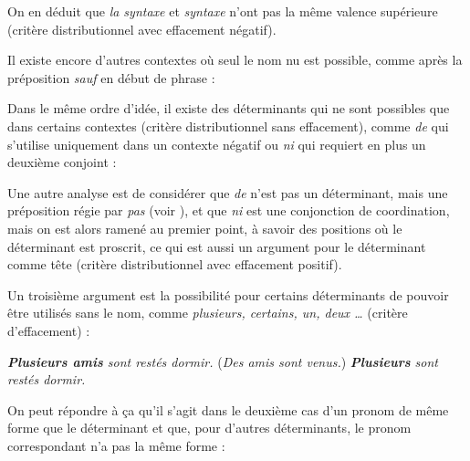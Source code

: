 On en déduit que \textit{la syntaxe} et \textit{syntaxe} n’ont pas la même valence supérieure (critère distributionnel avec effacement négatif).

Il existe encore d’autres contextes où seul le nom nu est possible, comme après la préposition \textit{sauf} en début de phrase :

\ea
  \z
\z

Dans le même ordre d’idée, il existe des déterminants qui ne sont possibles que dans certains contextes (critère distributionnel sans effacement), comme \textit{de} qui s’utilise uniquement dans un contexte négatif ou \textit{ni} qui requiert en plus un deuxième conjoint :

\ea
  \z
\z

Une autre analyse est de considérer que \textit{de} n’est pas un déterminant, mais une préposition régie par \textit{pas} (voir ), et que \textit{ni} est une conjonction de coordination, mais on est alors ramené au premier point, à savoir des positions où le déterminant est proscrit, ce qui est aussi un argument pour le déterminant comme tête (critère distributionnel avec effacement positif).



Un troisième argument est la possibilité pour certains déterminants de pouvoir être utilisés sans le nom, comme \textit{plusieurs, certains, un, deux …} (critère d’effacement) :

\ea
  \ea \textit{\textbf{{Plusieurs amis}}  {sont restés dormir.}}
  \ex (\textit{{Des amis sont venus.}}) \textit{\textbf{{Plusieurs}}  {sont restés dormir.}}
  \z
\z

On peut répondre à ça qu’il s’agit dans le deuxième cas d’un pronom de même forme que le déterminant et que, pour d’autres déterminants, le pronom correspondant n’a pas la même forme :

